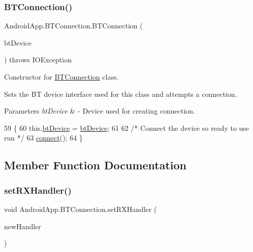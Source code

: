 \subsubsection{\texorpdfstring{B\+T\+Connection()}{BTConnection()}}
{\footnotesize\ttfamily Android\+App.\+B\+T\+Connection.\+B\+T\+Connection (\begin{DoxyParamCaption}\item[{Bluetooth\+Device}]{bt\+Device }\end{DoxyParamCaption}) throws I\+O\+Exception\hspace{0.3cm}{\ttfamily [inline]}}



Constructor for \hyperlink{class_android_app_1_1_b_t_connection}{B\+T\+Connection} class. 

Sets the BT device interface used for this class and attempts a connection.


\begin{DoxyParams}{Parameters}
{\em bt\+Device} & -\/ Device used for creating connection. \\
\hline
\end{DoxyParams}

\begin{DoxyCode}
59                                \{
60         this.\hyperlink{class_android_app_1_1_b_t_connection_a3ed1e51b0f24f0b20ca5c27270f2999c}{btDevice} = \hyperlink{class_android_app_1_1_b_t_connection_a3ed1e51b0f24f0b20ca5c27270f2999c}{btDevice};
61 
62         \textcolor{comment}{/* Connect the device so ready to use run */}
63         \hyperlink{class_android_app_1_1_b_t_connection_a1dfc9451ba1b40089f17ee081486602e}{connect}();
64     \}
\end{DoxyCode}


\subsection{Member Function Documentation}
\mbox{\label{class_android_app_1_1_b_t_connection_a41022747db3c5a8bf0f4ddbc7bf32a3d}} 
\subsubsection{\texorpdfstring{set\+R\+X\+Handler()}{setRXHandler()}}
{\footnotesize\ttfamily void Android\+App.\+B\+T\+Connection.\+set\+R\+X\+Handler (\begin{DoxyParamCaption}\item[{Handler}]{new\+Handler }\end{DoxyParamCaption})\hspace{0.3cm}{\ttfamily [inline]}}



